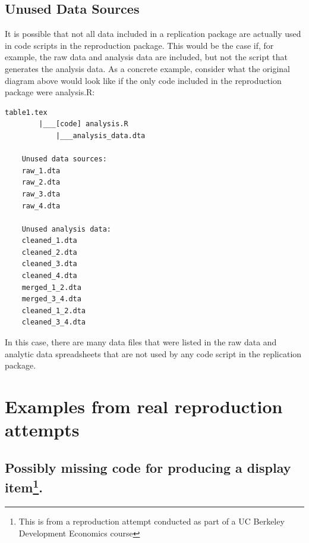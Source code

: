 \documentclass[]{book}
\begin{document}
\hypertarget{unused-data-sources}{%
\subsection{Unused Data Sources}\label{unused-data-sources}}

It is possible that not all data included in a replication package are actually used in code scripts in the reproduction package. This would be the case if, for example, the raw data and analysis data are included, but not the script that generates the analysis data. As a concrete example, consider what the original diagram above would look like if the only code included in the reproduction package were analysis.R:

\begin{verbatim}
table1.tex
        |___[code] analysis.R
            |___analysis_data.dta

    Unused data sources:
    raw_1.dta
    raw_2.dta
    raw_3.dta
    raw_4.dta

    Unused analysis data:
    cleaned_1.dta
    cleaned_2.dta
    cleaned_3.dta
    cleaned_4.dta
    merged_1_2.dta
    merged_3_4.dta
    cleaned_1_2.dta
    cleaned_3_4.dta
\end{verbatim}

In this case, there are many data files that were listed in the raw data and analytic data spreadsheets that are not used by any code script in the replication package.

\hypertarget{examples-from-real-reproduction-attempts}{%
\section{Examples from real reproduction attempts}\label{examples-from-real-reproduction-attempts}}

\hypertarget{possibly-missing-code-for-producing-a-display-item.}{%
\subsection[Possibly missing code for producing a display item.]{\texorpdfstring{Possibly missing code for producing a display item\footnote{This is from a reproduction attempt conducted as part of a UC Berkeley Development Economics course}.}{Possibly missing code for producing a display item.}}\label{possibly-missing-code-for-producing-a-display-item.}}
\end{document}
